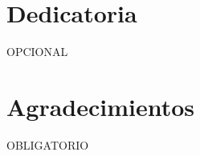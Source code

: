 \thispagestyle{empty}
\section*{\RaggedRight Dedicatoria}
\vspace{\baselineskip}
\justifying
OPCIONAL\\
\lipsum[1-1]
\newpage
\thispagestyle{empty}
\section*{\RaggedRight Agradecimientos}
\vspace{\baselineskip}
OBLIGATORIO\\
\lipsum[1-2]
\newpage